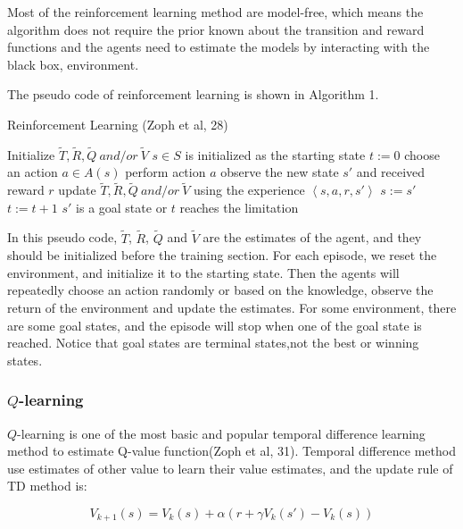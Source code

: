 \documentclass[14pt]{extarticle}
\begin{document}
Most of the reinforcement learning method are model-free, which means the algorithm does not require the prior  known about the transition and reward functions and the agents need to estimate the models by interacting with the black box, environment.

The pseudo code of reinforcement learning is shown in Algorithm 1.

\begin{algorithm}
    \caption{Reinforcement Learning (Zoph et al, 28) }\label{euclid}
    \begin{algorithmic}[1]
    \State Initialize $\tilde{T}, \tilde{R}, \tilde{Q} \ and/or\  \tilde{V}$
        \State $s \in S$ is initialized as the starting state
        \State $t := 0$
        \Repeat
            \State choose an action $a \in A(s)$
            \State perform action $a$
            \State observe the new state $s'$ and received reward $r$
            \State update $\tilde{T}, \tilde{R}, \tilde{Q} \ and/or\  \tilde{V}$
            \State using the experience $\left\langle s,a,r,s'\right\rangle $
            \State $s := s'$
            \State $t := t + 1$
        \Until $s'$ is a goal state or $t$ reaches the limitation
    \EndFor
    \end{algorithmic}
\end{algorithm}

In this pseudo code, $\tilde{T}$, $\tilde{R}$, $\tilde{Q}$ and $\tilde{V}$ are the estimates of the agent, and they should be initialized before the training section. For each episode, we reset the environment, and initialize it to the starting state. Then the agents will repeatedly choose an action randomly or based on the knowledge, observe the return of the environment and update the estimates. For some environment, there are some goal states, and the episode will stop when one of the goal state is reached. Notice that goal states are terminal states,not the best or winning states.

\subsubsection{$Q$-learning}

$Q$-learning is one of the most basic and popular temporal difference learning method to estimate Q-value function(Zoph et al, 31). Temporal difference method use estimates of other value to learn their value estimates, and the update rule of TD method is: 

$$V_{k+1}(s) = V_{k}(s) + \alpha(r + \gamma V_k(s') - V_k(s))$$ 
\end{document}
